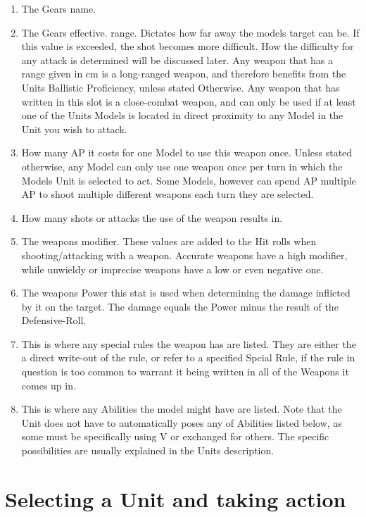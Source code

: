 \documentclass[a4paper,12pt]{report}
\begin{document}
\begin{adjustwidth}{-2cm}{-2cm}
\begin{multicols}{2}
\begin{enumerate}
	\item The Gears name.
	\item The Gears effective. range. Dictates how far away the models target can be. If this value is  exceeded, the shot becomes more difficult. How the difficulty for any attack is determined will be discussed later. Any weapon that has a range given in cm is a long-ranged weapon, and therefore benefits from the Units Ballistic Proficiency, unless stated Otherwise. Any weapon that has  written in this slot is a close-combat weapon, and can only be used if at least one of the Units Models is located in direct proximity to any Model in the Unit you wish to attack.
	\item How many AP it costs for one Model to use this weapon once. Unless stated otherwise, any Model can only use one weapon once per turn in which the Models Unit is selected to act. Some Models, however can spend AP multiple AP to shoot multiple different weapons each turn they are selected.
	\item How many shots or attacks the use of the weapon results in.
	\item The weapons modifier. These values are added to the Hit rolls when shooting/attacking with a weapon. Accurate weapons have a high modifier, while unwieldy or imprecise weapons have a low or even negative one.
	\item The weapons Power this stat is used when determining the damage inflicted by it on the target. The damage equals the Power minus the result of the Defensive-Roll.
	\item This is where any special rules the weapon has are listed. They are either the a direct write-out of the rule, or refer to a specified Spcial Rule, if the rule in question is too common to warrant it being written in all of the Weapons it comes up in.
	\item This is where any Abilities the model might have are listed. Note that the Unit does not have to automatically poses any of Abilities listed below, as some must be specifically  using V or exchanged for others. The specific possibilities are usually explained in the Units description.
	
\end{enumerate}
\end{multicols}
\end{adjustwidth}



\section{Selecting a Unit and taking action}
\end{document}
